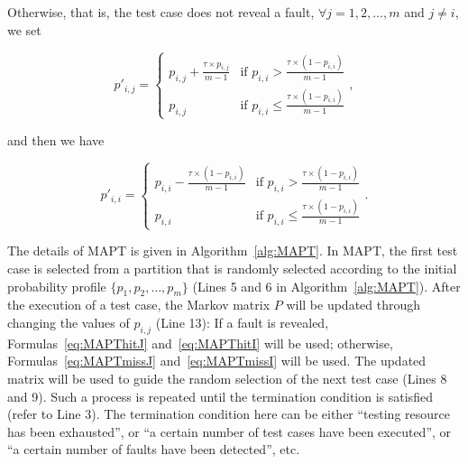 \documentclass[10pt,journal,compsoc]{IEEEtran}
\begin{document}
Otherwise, that is, the test case does not reveal a fault, $\forall j = 1, 2, \ldots, m$ and $j \neq i$, we set

\begin{equation}
\label{eq:MAPTmissJ}
p'_{i,j} =
\begin{cases}
p_{i,j} + \displaystyle\frac{\tau \times p_{i,j}}{m-1} & \text{if } p_{i,i} > \displaystyle\frac{\tau \times (1-p_{i,i})}{m-1} \\
p_{i,j} & \text{if } p_{i,i} \leq \displaystyle\frac{\tau \times (1-p_{i,i})}{m-1}
\end{cases},
\end{equation}

and then we have

\begin{equation}
\label{eq:MAPTmissI}
p'_{i,i} =
\begin{cases}
p_{i,i} - \displaystyle\frac{\tau \times (1-p_{i,i})}{m-1} & \text{if } p_{i,i} > \displaystyle\frac{\tau \times (1-p_{i,i})}{m-1} \\
p_{i,i} & \text{if } p_{i,i} \leq \displaystyle\frac{\tau \times (1-p_{i,i})}{m-1}
\end{cases}.
\end{equation}

The details of MAPT is given in Algorithm~\ref{alg:MAPT}. In MAPT, the first test case is selected from a partition that is randomly selected according to the initial probability profile $\{p_1, p_2, \ldots, p_m\}$ (Lines 5 and 6 in Algorithm~\ref{alg:MAPT}). After the execution of a test case, the Markov matrix $P$ will be updated through changing the values of $p_{i,j}$ (Line 13): If a fault is revealed, Formulas~\ref{eq:MAPThitJ} and~\ref{eq:MAPThitI} will be used; otherwise, Formulas~\ref{eq:MAPTmissJ} and~\ref{eq:MAPTmissI} will be used. The updated matrix will be used to guide the random selection of the next test case (Lines 8 and 9). Such a process is repeated until the termination condition is satisfied (refer to Line 3). The termination condition here can be either ``testing resource has been exhausted'', or ``a certain number of test cases have been executed'', or ``a certain number of faults have been detected'', etc.
\end{document}
